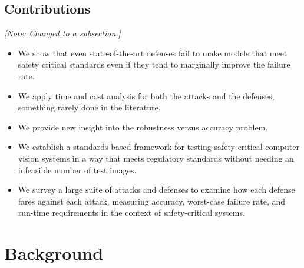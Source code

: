 \documentclass[journal]{IEEEtran}
\newcommand{\cm}[1]{\textit{{\color{blue}#1}}}
\begin{document}
\subsection{Contributions} 
\cm{[Note: Changed to a subsection.]}
\begin{itemize}
    \item We show that even state-of-the-art defenses fail to make models that meet safety critical standards even if they tend to marginally improve the failure rate.
    \item We apply time and cost analysis for both the attacks and the defenses, something rarely done in the literature.
    \item We provide new insight into the robustness versus accuracy problem.
    \item We establish a standards-based framework for testing safety-critical computer vision systems in a way that meets regulatory standards without needing an infeasible number of test images.
    \item We survey a large suite of attacks and defenses to examine how each defense fares against each attack, measuring accuracy, worst-case failure rate, and run-time requirements in the context of safety-critical systems.
\end{itemize}


\section{Background}
\end{document}
